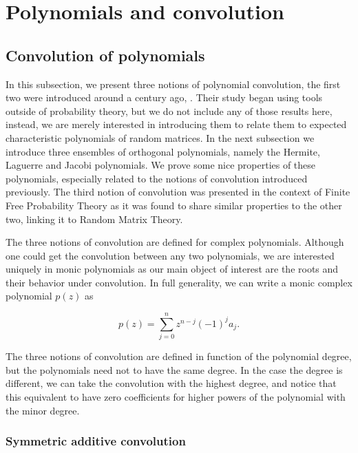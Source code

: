 \section{Polynomials and convolution} \label{sec:polynomials}

\subsection{Convolution of polynomials}

In this subsection, we present three notions of polynomial convolution, the first two were introduced around a century ago, \cite{walsh1922location,szeg1939orthogonal}. Their study began using tools outside of probability theory, but we do not include any of those results here, instead, we are merely interested in introducing them to relate them to expected characteristic polynomials of random matrices. In the next subsection we introduce three ensembles of orthogonal polynomials, namely the Hermite, Laguerre and Jacobi polynomials. We prove some nice properties of these polynomials, especially related to the notions of convolution introduced previously.  The third notion of convolution was presented in the context of Finite Free Probability Theory \cite{article:finitefree} as it was found to share similar properties to the other two, linking it to Random Matrix Theory.

The three notions of convolution are defined for complex polynomials. Although one could get the convolution between any two polynomials, we are interested uniquely in monic polynomials as our main object of interest are the roots and their behavior under convolution. In full generality, we can write a monic complex polynomial $p(z)$ as

\begin{equation*}
    p(z) = \sum_{j=0}^n z^{n-j}(-1)^{j}a_j.
\end{equation*}

The three notions of convolution are defined in function of the polynomial degree, but the polynomials need not to have the same degree. In the case the degree is different, we can take the convolution with the highest degree, and notice that this equivalent to have zero coefficients for higher powers of the polynomial with the minor degree.

\subsubsection{Symmetric additive convolution}

